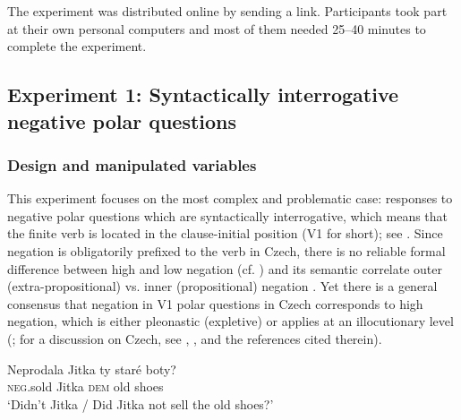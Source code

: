 \documentclass[output=paper,colorlinks,citecolor=brown]{langscibook}
\begin{document}
The experiment was distributed online by sending a link. Participants took part at their own personal computers and most of them needed 25--40 minutes to complete the experiment.

\subsection{Experiment 1: Syntactically interrogative negative polar questions}\label{hrdsim:sec:e1}

\subsubsection{Design and manipulated variables}

This experiment focuses on the most complex and problematic case: responses to negative polar questions which are syntactically interrogative, which means that the finite verb is located in the clause-initial position (V1 for short); see . Since negation is obligatorily prefixed to the verb in Czech, there is no reliable formal difference between high and low negation (cf. \citealt{hrd+:Ladd1981}) and its semantic correlate outer (extra-propositional) vs. inner (propositional) negation \citep{hrd+:AnderBois2019,Goodhue2022}. Yet there is a general consensus that negation in V1 polar questions in Czech corresponds to high negation, which is either pleonastic (expletive) or applies at an illocutionary level (\citealt{hrd+:Repp2013}; for a discussion on Czech, see \citealt{Stankova2023}, \citealt{Stankova.Simik2024}, and the references cited therein).

\ea \gll Neprodala Jitka ty staré boty?\label{hrdsim:ex:negV1}\\
\textsc{neg}.sold Jitka \textsc{dem} old shoes\\
\glt `Didn't Jitka / Did Jitka not sell the old shoes?' 
\z
\end{document}

